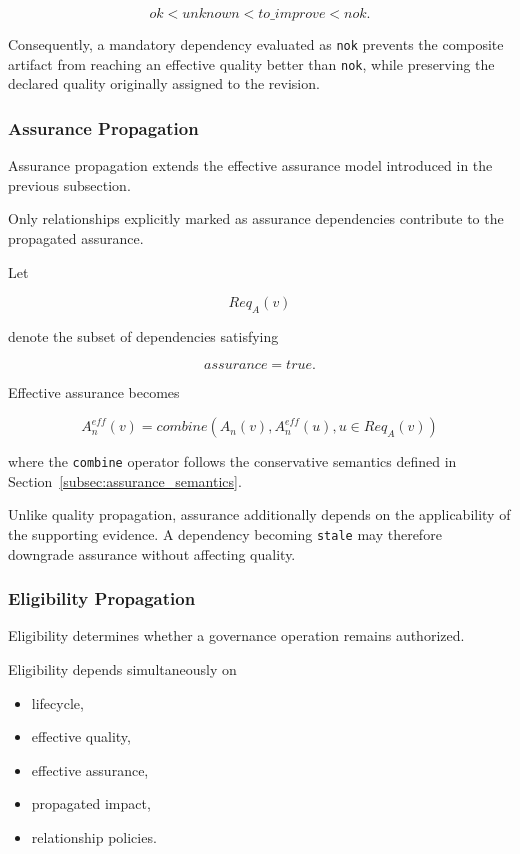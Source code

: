 \documentclass[10pt]{article}
\begin{document}
\[
ok
<
unknown
<
to\_improve
<
nok.
\]

Consequently, a mandatory dependency evaluated as
\texttt{nok}
prevents the composite artifact from reaching an effective quality better than
\texttt{nok},
while preserving the declared quality originally assigned to the revision.

\subsubsection{Assurance Propagation}

Assurance propagation extends the effective assurance model introduced in the
previous subsection.

Only relationships explicitly marked as assurance dependencies contribute to
the propagated assurance.

Let

\[
Req_A(v)
\]

denote the subset of dependencies satisfying

\[
assurance=true.
\]

Effective assurance becomes

\begin{equation}
A_n^{eff}(v)
=
combine
\left(
A_n(v),
A_n^{eff}(u),
u\in Req_A(v)
\right)
\label{eq:assurance_propagation}
\end{equation}

where the
\texttt{combine}
operator follows the conservative semantics defined in
Section~\ref{subsec:assurance_semantics}.

Unlike quality propagation, assurance additionally depends on the applicability
of the supporting evidence. A dependency becoming
\texttt{stale}
may therefore downgrade assurance without affecting quality.

\subsubsection{Eligibility Propagation}

Eligibility determines whether a governance operation remains authorized.

Eligibility depends simultaneously on

\begin{itemize}
    \item lifecycle,
    \item effective quality,
    \item effective assurance,
    \item propagated impact,
    \item relationship policies.
\end{itemize}
\end{document}
